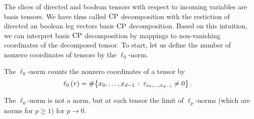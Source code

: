 



\label{sec:basisCP}



The slices of directed and boolean tensors with respect to incoming variables are basis tensors.
We have thus called $\mathrm{CP}$ decomposition with the restiction of directed an boolean leg vectors basis $\mathrm{CP}$ decomposition.
Based on this intuition, we can interpret basis $\mathrm{CP}$ decomposition by mappings to non-vanishing coordinates of the decomposed tensor.
To start, let us define the number of nonzero coordinates of tensors by the $\ell_0$-norm.

\begin{definition}
    The $\ell_0$-norm counts the nonzero coordinates of a tensor by
    \begin{align*}
        \ell_0\left(\tau\right) = \#\big\{ x_{0},\ldots,x_{d-1} \, : \, \tau_{x_{0},\ldots,x_{d-1} }\neq 0 \big\} \, .
    \end{align*}
\end{definition}

The $\ell_0$-norm is not a norm, but at each tensor the limit of $\ell_p$-norms (which are norms for $p\geq1$) for $p \rightarrow 0$.

